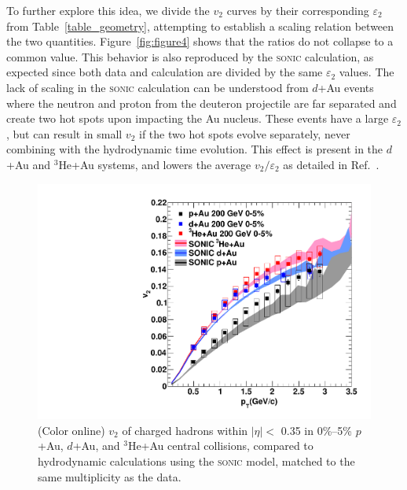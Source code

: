 \documentclass[%
reprint,
showpacs,preprintnumbers,
 amsmath,amssymb,
 aps,
]{revtex4-1}
\newcommand{\dau}{\mbox{$d$+Au}\xspace}
\newcommand{\pau}{\mbox{$p$+Au}\xspace}
\newcommand{\hau}{\mbox{$^3\text{He}$+Au}\xspace}
\begin{document}
To further explore this idea, we divide the $v_2$ curves by their corresponding $\varepsilon_2$ from Table~\ref{table_geometry}, attempting to establish a scaling relation between the two quantities. Figure~\ref{fig:figure4} shows that the ratios do not collapse to a common value. This behavior is also reproduced by the \textsc{sonic} calculation, as expected since both data and calculation are divided by the same $\varepsilon_2$ values. The lack of scaling in the \textsc{sonic} calculation can be understood from \dau events where the neutron and proton from the deuteron projectile are far separated and create two hot spots upon impacting the Au nucleus. These events have a large $\varepsilon_2$, but can result in small $v_2$ if the two hot spots evolve separately, never combining with the hydrodynamic time evolution. This effect is present in the \dau and \hau systems, and lowers the average $v_2/\varepsilon_2$ as detailed in Ref.~\cite{nagle_exploiting_2013}. 

\begin{figure}[htbp]
  \includegraphics[scale=0.45]{Figures/figure3.pdf}
  \caption{(Color online) $v_2$ of charged hadrons within $|\eta| <$ 0.35 in 0\%--5\% \pau, \dau, and \hau central collisions, compared to hydrodynamic calculations using the \textsc{sonic} model, matched to the same multiplicity as the data.}
\label{fig:figure3}
\end{figure}
\end{document}
